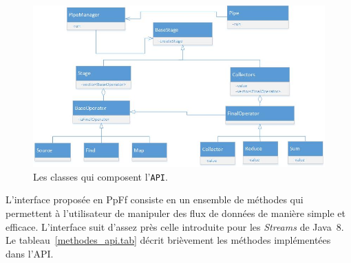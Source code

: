 \begin{figure}[ht]
\centering
     \includegraphics[width=1.0\textwidth]{Figures/ClassDiagramme.jpg}
      \caption{Les classes qui composent l'\texttt{API}.}
       \label{ClassDiagramme.fig}
\end{figure}


L'interface propos\'ee en PpFf consiste en un ensemble de m\'ethodes qui permettent \`a l'utilisateur de manipuler des flux de donn\'ees de mani\`ere simple et efficace. L'interface suit d'assez pr\`es celle introduite pour les \emph{Streams} de Java~8. Le tableau~\ref{methodes_api.tab} d\'ecrit bri\`evement les m\'ethodes impl\'ement\'ees dans l'API.





%
%
%


